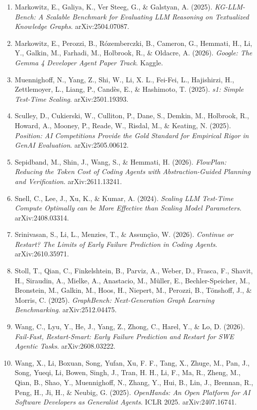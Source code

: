 \documentclass[10pt,a4paper]{article}
\begin{document}
\begin{enumerate}
\item
  Markowitz, E., Galiya, K., Ver Steeg, G., \& Galstyan, A. (2025). \emph{KG-LLM-Bench: A Scalable Benchmark for Evaluating LLM Reasoning on Textualized Knowledge Graphs}. arXiv:2504.07087.
\item
  Markowitz, E., Perozzi, B., Rózemberczki, B., Cameron, G., Hemmati, H., Li, Y., Galkin, M., Farhadi, M., Holbrook, R., \& Oldacre, A. (2026). \emph{Google: The Gemma 4 Developer Agent Paper Track}. Kaggle.
\item
  Muennighoff, N., Yang, Z., Shi, W., Li, X. L., Fei-Fei, L., Hajishirzi, H., Zettlemoyer, L., Liang, P., Candès, E., \& Hashimoto, T. (2025). \emph{s1: Simple Test-Time Scaling}. arXiv:2501.19393.
\item
  Sculley, D., Cukierski, W., Culliton, P., Dane, S., Demkin, M., Holbrook, R., Howard, A., Mooney, P., Reade, W., Risdal, M., \& Keating, N. (2025). \emph{Position: AI Competitions Provide the Gold Standard for Empirical Rigor in GenAI Evaluation}. arXiv:2505.00612.
\item
  Sepidband, M., Shin, J., Wang, S., \& Hemmati, H. (2026). \emph{FlowPlan: Reducing the Token Cost of Coding Agents with Abstraction-Guided Planning and Verification}. arXiv:2611.13241.
\item
  Snell, C., Lee, J., Xu, K., \& Kumar, A. (2024). \emph{Scaling LLM Test-Time Compute Optimally can be More Effective than Scaling Model Parameters}. arXiv:2408.03314.
\item
  Srinivasan, S., Li, L., Menzies, T., \& Assunção, W. (2026). \emph{Continue or Restart? The Limits of Early Failure Prediction in Coding Agents}. arXiv:2610.35971.
\item
  Stoll, T., Qian, C., Finkelshtein, B., Parviz, A., Weber, D., Frasca, F., Shavit, H., Siraudin, A., Mielke, A., Anastacio, M., Müller, E., Bechler-Speicher, M., Bronstein, M., Galkin, M., Hoos, H., Niepert, M., Perozzi, B., Tönshoff, J., \& Morris, C. (2025). \emph{GraphBench: Next-Generation Graph Learning Benchmarking}. arXiv:2512.04475.
\item
  Wang, C., Lyu, Y., He, J., Yang, Z., Zhong, C., Harel, Y., \& Lo, D. (2026). \emph{Fail-Fast, Restart-Smart: Early Failure Prediction and Restart for SWE Agentic Tasks}. arXiv:2608.03222.
\item
  Wang, X., Li, Boxuan, Song, Yufan, Xu, F. F., Tang, X., Zhuge, M., Pan, J., Song, Yueqi, Li, Bowen, Singh, J., Tran, H. H., Li, F., Ma, R., Zheng, M., Qian, B., Shao, Y., Muennighoff, N., Zhang, Y., Hui, B., Lin, J., Brennan, R., Peng, H., Ji, H., \& Neubig, G. (2025). \emph{OpenHands: An Open Platform for AI Software Developers as Generalist Agents}. ICLR 2025. arXiv:2407.16741.

\end{enumerate}
\end{document}
